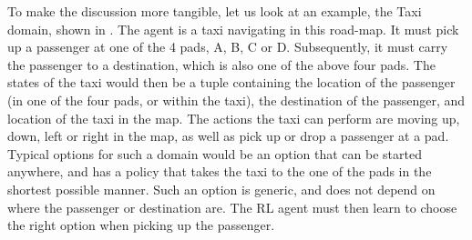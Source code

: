 \begin{example}
  \label{example:taxi}
To make the discussion more tangible, let us look at an example, the
Taxi domain, shown in . The agent is a taxi
navigating in this road-map. It must pick up a passenger at one of the
4 pads, A, B, C or D.  Subsequently, it must carry the passenger to a
destination, which is also one of the above four pads. The states of
the taxi would then be a tuple containing the location of the
passenger (in one of the four pads, or within the taxi), the
destination of the passenger, and location of the taxi in the map.
The actions the taxi can perform are moving up, down, left or right in
the map, as well as pick up or drop a passenger at a pad. 
Typical options for such a domain would be an option that can be
started anywhere, and has a policy that takes the taxi to the one of
the pads in the shortest possible manner. Such an option is generic,
and does not depend on where the passenger or destination are. The RL
agent must then learn to choose the right option when picking up the
passenger.
\end{example}

